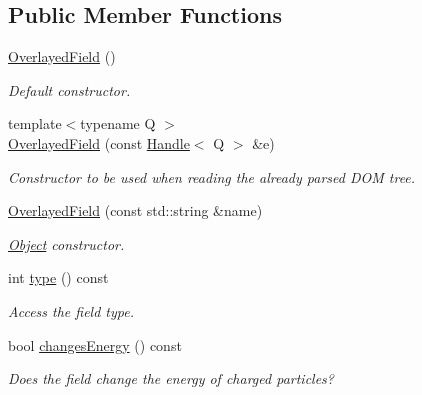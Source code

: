 \subsection*{Public Member Functions}
\begin{DoxyCompactItemize}
\item 
\hyperlink{class_d_d4hep_1_1_geometry_1_1_overlayed_field_ad03ce820722778df653df02a079b5958}{OverlayedField} ()
\begin{DoxyCompactList}\small\item\em Default constructor. \item\end{DoxyCompactList}\item 
{\footnotesize template$<$typename Q $>$ }\\\hyperlink{class_d_d4hep_1_1_geometry_1_1_overlayed_field_af64d7fb69a5f08d5f128afddbb604d3e}{OverlayedField} (const \hyperlink{class_d_d4hep_1_1_handle}{Handle}$<$ Q $>$ \&e)
\begin{DoxyCompactList}\small\item\em Constructor to be used when reading the already parsed DOM tree. \item\end{DoxyCompactList}\item 
\hyperlink{class_d_d4hep_1_1_geometry_1_1_overlayed_field_afb142bf8642bee1ebd9a4ed733f4d90a}{OverlayedField} (const std::string \&name)
\begin{DoxyCompactList}\small\item\em \hyperlink{class_d_d4hep_1_1_geometry_1_1_overlayed_field_1_1_object}{Object} constructor. \item\end{DoxyCompactList}\item 
int \hyperlink{class_d_d4hep_1_1_geometry_1_1_overlayed_field_a27ef8145f77b824398f5caf854a598b5}{type} () const 
\begin{DoxyCompactList}\small\item\em Access the field type. \item\end{DoxyCompactList}\item 
bool \hyperlink{class_d_d4hep_1_1_geometry_1_1_overlayed_field_aae467e2f06b9842ef57133cefc0a0ce0}{changesEnergy} () const 
\begin{DoxyCompactList}\small\item\em Does the field change the energy of charged particles? \item\end{DoxyCompactList}\item 

\end{DoxyCompactItemize}
